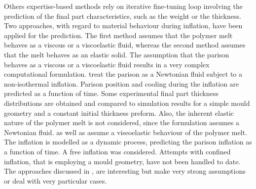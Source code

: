 Others expertise-based methods rely on iterative fine-tuning loop involving the prediction of the final part characteristics, such as the weight or the thickness. Two approaches, with regard to material behaviour during inflation, have been applied for the prediction. The first method assumes that the polymer melt behaves as a viscous or a viscoelastic fluid, whereas the second method assumes that the melt behaves as an elastic solid. The assumption that the parison behaves as a viscous or a viscoelastic fluid results in a very complex computational formulation. \citep{poslinski1990nonisothermal} treat the parison as a Newtonian fluid subject to a non-isothermal inflation. Parison position and cooling during the inflation are predicted as a function of time. Some experimental final part thickness distributions are obtained and compared to simulation results for a simple mould geometry and a constant initial thickness preform. Also, the inherent elastic nature of the polymer melt is not considered, since the formulation assumes a Newtonian fluid. \cite{ryan1982dynamics} as well as \citep{khayat1992inflation} assume a viseoelastic behaviour of the polymer melt. The inflation is modelled as a dynamic process, predicting the parison inflation as a function of time. A free inflation was considered. Attempts with confined inflation, that is employing a mould geometry, have not been handled to date. 
The approaches discussed in \citep{poslinski1990nonisothermal}, \cite{ryan1982dynamics} \citep{khayat1992inflation} are interesting but make very strong assumptions or deal with very particular cases.

